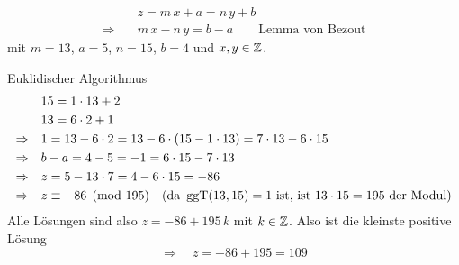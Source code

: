 \begin{loesung}
\begin{align*}
& z = m\,x + a = n\,y + b\\
\Rightarrow\quad & m\,x - n\,y = b - a \qquad \text{Lemma von Bezout}
\end{align*}
mit $m = 13$, $a = 5$, $n = 15$, $b = 4$ und $x, y \in \mathbb{Z}$.

Euklidischer Algorithmus
\begin{align*}
& 15 = 1 \cdot 13 + 2\\
& 13 = 6 \cdot 2 + 1\\
\Rightarrow\quad & 1 = 13 - 6 \cdot 2 = 13 - 6 \cdot (15 - 1 \cdot 13) = 7 \cdot 13 - 6 \cdot 15\\
\Rightarrow\quad & b - a = 4 - 5 = -1 = 6 \cdot 15 - 7 \cdot 13\\
\Rightarrow\quad & z = 5 - 13 \cdot 7 = 4 - 6 \cdot 15 = -86\\
\Rightarrow\quad & z \equiv -86 \pmod{195} \quad \text{(da } \operatorname{ggT}(13, 15) = 1 \text{ ist, ist } 13 \cdot 15 = 195 \text{ der Modul)}
\end{align*}
Alle Lösungen sind also $z = -86 + 195\,k$ mit $k \in \mathbb{Z}$. Also ist die kleinste positive Lösung
\[ \Rightarrow\quad z = -86 + 195 = 109 \]
\end{loesung}
